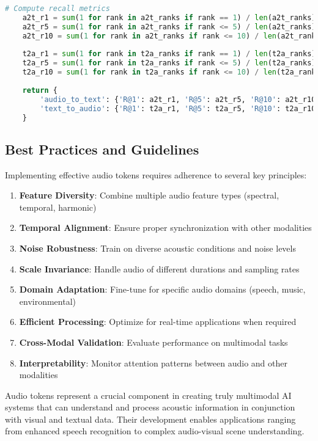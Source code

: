 \begin{lstlisting}[language=Python, caption=Audio-text retrieval evaluation]
    # Compute recall metrics
    a2t_r1 = sum(1 for rank in a2t_ranks if rank == 1) / len(a2t_ranks)
    a2t_r5 = sum(1 for rank in a2t_ranks if rank <= 5) / len(a2t_ranks)
    a2t_r10 = sum(1 for rank in a2t_ranks if rank <= 10) / len(a2t_ranks)
    
    t2a_r1 = sum(1 for rank in t2a_ranks if rank == 1) / len(t2a_ranks)
    t2a_r5 = sum(1 for rank in t2a_ranks if rank <= 5) / len(t2a_ranks)
    t2a_r10 = sum(1 for rank in t2a_ranks if rank <= 10) / len(t2a_ranks)
    
    return {
        'audio_to_text': {'R@1': a2t_r1, 'R@5': a2t_r5, 'R@10': a2t_r10},
        'text_to_audio': {'R@1': t2a_r1, 'R@5': t2a_r5, 'R@10': t2a_r10}
    }
\end{lstlisting}

\subsection{Best Practices and Guidelines}

Implementing effective audio tokens requires adherence to several key principles:

\begin{enumerate}
\item \textbf{Feature Diversity}: Combine multiple audio feature types (spectral, temporal, harmonic)
\item \textbf{Temporal Alignment}: Ensure proper synchronization with other modalities
\item \textbf{Noise Robustness}: Train on diverse acoustic conditions and noise levels
\item \textbf{Scale Invariance}: Handle audio of different durations and sampling rates
\item \textbf{Domain Adaptation}: Fine-tune for specific audio domains (speech, music, environmental)
\item \textbf{Efficient Processing}: Optimize for real-time applications when required
\item \textbf{Cross-Modal Validation}: Evaluate performance on multimodal tasks
\item \textbf{Interpretability}: Monitor attention patterns between audio and other modalities
\end{enumerate}

Audio tokens represent a crucial component in creating truly multimodal AI systems that can understand and process acoustic information in conjunction with visual and textual data. Their development enables applications ranging from enhanced speech recognition to complex audio-visual scene understanding.
